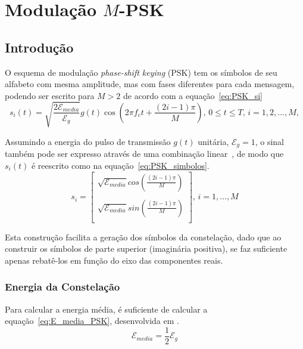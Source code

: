 \section{Modulação \texorpdfstring{$M$}{M}-PSK}

\subsection{Introdução}
O esquema de modulação \textit{phase-shift keying} (PSK) tem os símbolos de seu alfabeto com mesma amplitude, mas com fases diferentes para cada mensagem, podendo ser escrito para $M > 2$ de acordo com a equação~\ref{eq:PSK_si}
\begin{equation}
    s_i(t) = \sqrt{\frac{2\mathcal{E}_{media}}{\mathcal{E}_g}} g(t) \cos\left(2\pi f_c t + \frac{(2i-1)\pi}{M}\right), \, 0 \leq t \leq T, \, i = 1,2,\dots,M,
    \label{eq:PSK_si}
\end{equation}

Assumindo a energia do pulso de transmissão $g(t)$ unitária, $\mathcal{E}_g = 1$, o sinal também pode ser expresso através de uma combinação linear~\cite{Cecilio}, de modo que $s_i(t)$ é reescrito como na equação~\ref{eq:PSK_simbolos}.
\begin{equation}
    s_i =   \begin{bmatrix}
                \sqrt{\mathcal{E}_{media}} cos(\frac{(2i-1)\pi}{M}) \\
                \\ 
                \sqrt{\mathcal{E}_{media}} sin(\frac{(2i-1)\pi}{M}) \\ 
            \end{bmatrix}, \, i = 1,\dots,M
    \label{eq:PSK_simbolos}
\end{equation}

Esta construção facilita a geração dos símbolos da constelação, dado que ao construir os símbolos de parte superior (imaginária positiva), se faz suficiente apenas rebatê-los em função do eixo das componentes reais.
\subsubsection{Energia da Constelação} 
Para calcular a energia média, é suficiente de calcular a equação~\ref{eq:E_media_PSK}, desenvolvida em \cite{Cecilio,Proakis}.
\begin{equation}
    \mathcal{E}_{media} = \frac{1}{2} \mathcal{E}_g
    \label{eq:E_media_PSK}
\end{equation}

